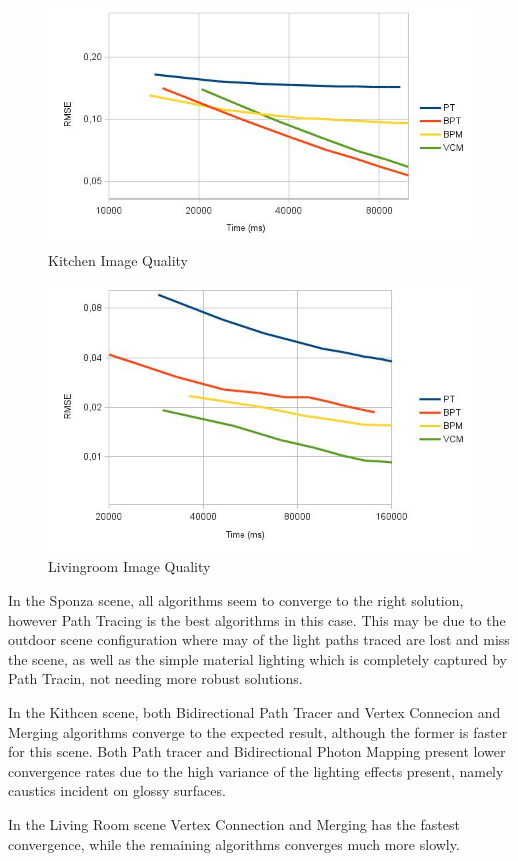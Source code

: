 \begin{figure}[H]
\includegraphics[width=\linewidth]{img/kitchenImgq.jpg}
\caption{\label{img:kitchenImgq} Kitchen Image Quality}
\end{figure}

\begin{figure}[H]
\includegraphics[width=\linewidth]{img/livingroomImgq.jpg}
\caption{\label{img:livingroomImgq} Livingroom Image Quality}
\end{figure}

In the Sponza scene, all algorithms seem to converge to the right solution, however Path Tracing is the best algorithms in this case. This may be due to the outdoor scene configuration where may of the light paths traced are lost and miss the scene, as well as the simple material lighting which is completely captured by Path Tracin, not needing more robust solutions.

In the Kithcen scene, both Bidirectional Path Tracer and Vertex Connecion and Merging algorithms converge to the expected result, although the former is faster for this scene. Both Path tracer and Bidirectional Photon Mapping present lower convergence rates due to the high variance of the lighting effects present, namely caustics incident on glossy surfaces.

In the Living Room scene Vertex Connection and Merging has the fastest convergence, while the remaining algorithms converges much more slowly.